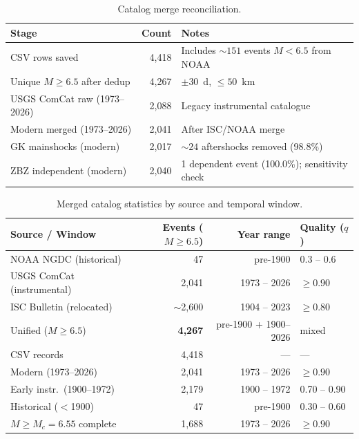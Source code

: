 \documentclass[draft]{agujournal2019}
\begin{document}
\noindent{}

\begin{table}[htbp]
\centering
\caption{Catalog merge reconciliation.}
\label{tab:reconciliation}
\begin{tabular}{lrl}
\hline
Stage & Count & Notes \\
\hline
CSV rows saved & 4{,}418 & Includes ${\sim}151$ events $M < 6.5$ from NOAA \\
Unique $M \ge 6.5$ after dedup & 4{,}267 & $\pm 30$~d, $\le 50$~km \\
USGS ComCat raw (1973--2026) & 2{,}088 & Legacy instrumental catalogue \\
Modern merged (1973--2026) & 2{,}041 & After ISC/NOAA merge \\
GK mainshocks (modern) & 2{,}017 & ${\sim}24$ aftershocks removed (98.8\%) \\
ZBZ independent (modern) & 2{,}040 & 1 dependent event (100.0\%); sensitivity check \\
\hline
\end{tabular}
\end{table}

\begin{table}[htbp]
\centering
\caption{Merged catalog statistics by source and temporal window.}
\label{tab:catalog}
\begin{tabular}{lrrl}
\hline
Source / Window & Events ($M \ge 6.5$) & Year range & Quality ($q$) \\
\hline
NOAA NGDC (historical)        & 47              & pre-1900            & 0.3 -- 0.6 \\
USGS ComCat (instrumental)    & 2{,}041         & 1973 -- 2026        & $\ge 0.90$ \\
ISC Bulletin (relocated)      & $\sim$2{,}600   & 1904 -- 2023        & $\ge 0.80$ \\
\hline
Unified ($M \ge 6.5$)         & \textbf{4{,}267} & pre-1900 + 1900--2026 & mixed \\
\quad CSV records             & 4{,}418          & ---                 & --- \\
\quad Modern (1973--2026)     & 2{,}041          & 1973 -- 2026        & $\ge 0.90$ \\
\quad Early instr.\ (1900--1972) & 2{,}179       & 1900 -- 1972        & 0.70 -- 0.90 \\
\quad Historical ($<$1900)    & 47               & pre-1900            & 0.30 -- 0.60 \\
$M \ge M_c = 6.55$ complete   & 1{,}688          & 1973 -- 2026        & $\ge 0.90$ \\
\hline
\end{tabular}
\end{table}
\end{document}
